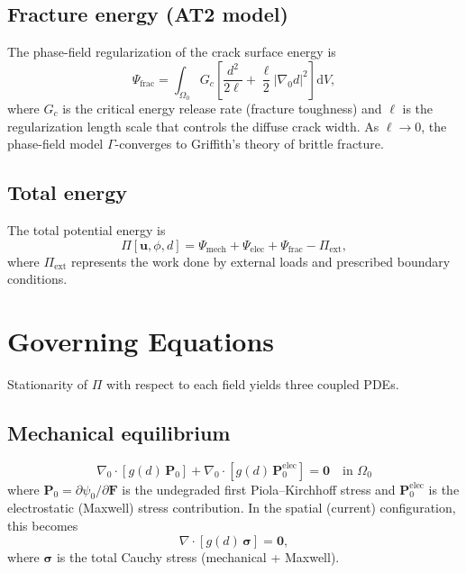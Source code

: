 \documentclass[11pt,a4paper]{article}
\newcommand{\FF}{\bm{F}}
\newcommand{\ssigma}{\bm{\sigma}}
\newcommand{\PP}{\bm{P}}
\newcommand{\uu}{\bm{u}}
\newcommand{\grad}{\nabla}
\newcommand{\Grad}{\nabla_{\!0}}
\newcommand{\diff}{\mathrm{d}}
\begin{document}
\subsection{Fracture energy (AT2 model)}

The phase-field regularization of the crack surface energy is
\begin{equation}
    \Psi_{\mathrm{frac}} = \int_{\Omega_0} G_c \left[ \frac{d^2}{2\ell} + \frac{\ell}{2} |\Grad d|^2 \right] \diff V,
\end{equation}
where $G_c$ is the critical energy release rate (fracture toughness) and $\ell$ is the regularization length scale that controls the diffuse crack width. As $\ell \to 0$, the phase-field model $\Gamma$-converges to Griffith's theory of brittle fracture.

\subsection{Total energy}

The total potential energy is
\begin{equation}
    \Pi[\uu, \phi, d] = \Psi_{\mathrm{mech}} + \Psi_{\mathrm{elec}} + \Psi_{\mathrm{frac}} - \Pi_{\mathrm{ext}},
\end{equation}
where $\Pi_{\mathrm{ext}}$ represents the work done by external loads and prescribed boundary conditions.

\section{Governing Equations}

Stationarity of $\Pi$ with respect to each field yields three coupled PDEs.

\subsection{Mechanical equilibrium}

\begin{equation}
    \boxed{\Grad \cdot \left[ g(d)\, \PP_0 \right] + \Grad \cdot \left[ g(d)\, \PP_0^{\mathrm{elec}} \right] = \bm{0} \quad \text{in } \Omega_0}
\end{equation}
where $\PP_0 = \partial \psi_0 / \partial \FF$ is the undegraded first Piola--Kirchhoff stress and $\PP_0^{\mathrm{elec}}$ is the electrostatic (Maxwell) stress contribution. In the spatial (current) configuration, this becomes
\begin{equation}
    \grad \cdot \left[ g(d)\, \ssigma \right] = \bm{0},
\end{equation}
where $\ssigma$ is the total Cauchy stress (mechanical + Maxwell).
\end{document}
